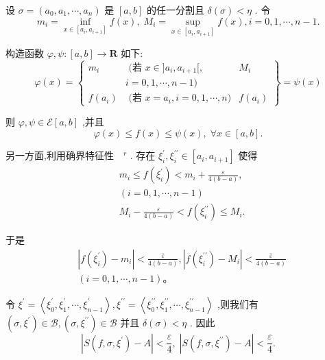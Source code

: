 设 $\sigma  = \left( {{a}_{0},{a}_{1},\cdots ,{a}_{n}}\right)$ 是 $\left\lbrack  {a,b}\right\rbrack$ 的任一分割且 $\delta \left( \sigma \right)  < \eta$ . 令
$${m}_{i} = \mathop{\inf }\limits_{{x \in  \left\lbrack  {{a}_{i},{a}_{i + 1}}\right\rbrack  }}f\left( x\right) ,\;{M}_{i} = \mathop{\sup }\limits_{{x \in  \left\lbrack  {{a}_{i},{a}_{i + 1}}\right\rbrack  }}f\left( x\right) ,i = 0,1,\cdots ,n - 1.$$

构造函数 $\varphi ,\psi  : \left\lbrack  {a,b}\right\rbrack   \rightarrow  \mathbf{R}$ 如下:
$$\varphi \left( x\right)  = \left\{  \begin{matrix} {m}_{i} & \text{ (若 }x \in  \rbrack {a}_{i},{a}_{i + 1}\lbrack , & {M}_{i} \\   & i = 0,1,\cdots ,n - 1) & \\  f\left( {a}_{i}\right) & \text{ (若 }x = {a}_{i},i = 0,1,\cdots ,n) & f\left( {a}_{i}\right)  \end{matrix}\right\}   = \psi \left( x\right)$$

则 $\varphi ,\psi  \in  \mathcal{E}\left\lbrack  {a,b}\right\rbrack$ ,并且
$$\varphi \left( x\right)  \leq  f\left( x\right)  \leq  \psi \left( x\right) ,\;\forall x \in  \left\lbrack  {a,b}\right\rbrack  .$$

另一方面,利用确界特征性 ${\text{  }}^{r}$ . 存在 ${\xi }_{i}^{\prime },{\xi }_{i}^{\prime \prime } \in  \left\lbrack  {{a}_{i},{a}_{i + 1}}\right\rbrack$ 使得
\begin{align*}
	&{m}_{i} \leq  f\left( {\xi }_{i}^{\prime }\right)  < {m}_{i} + \frac{\varepsilon }{4\left( {b - a}\right) },\\
	&\left( {i = 0,1,\cdots ,n - 1}\right)\\
	&{M}_{i} - \frac{\varepsilon }{4\left( {b - a}\right) } < f\left( {\xi }_{i}^{\prime \prime }\right)  \leq  {M}_{i}.
\end{align*}

于是
\begin{align*}
	&\left| {f\left( {\xi }_{i}^{\prime }\right)  - {m}_{i}}\right|  < \frac{\bar{\varepsilon }}{4\left( {b - a}\right) },\left| {f\left( {\xi }_{i}^{\prime \prime }\right)  - {M}_{i}}\right|  < \frac{\bar{\varepsilon }}{4\left( {b - a}\right) }\\
	&\left( {i = 0,1,\cdots ,n - 1}\right) 。
\end{align*}

令 ${\xi }^{\prime } = \left\langle  {{\xi }_{0}^{\prime },{\xi }_{1}^{\prime },\cdots ,{\xi }_{n - 1}^{\prime }}\right\rangle  ,{\xi }^{\prime \prime } = \left\langle  {{\xi }_{0}^{\prime \prime },{\xi }_{1}^{\prime \prime },\cdots ,{\xi }_{n - 1}^{\prime \prime }}\right\rangle$ ,则我们有 $\left( {\sigma ,{\xi }^{\prime }}\right)  \in  \mathcal{B},\left( {\sigma ,{\xi }^{\prime \prime }}\right)  \in  \mathcal{B}$ 并且 $\delta \left( \sigma \right)  < \eta$ . 因此
$$\left| {S\left( {f,\sigma ,{\xi }^{\prime }}\right)  - A}\right|  < \frac{\varepsilon }{4},\;\left| {S\left( {f,\sigma ,{\xi }^{\prime \prime }}\right)  - A}\right|  < \frac{\varepsilon }{4}.$$

